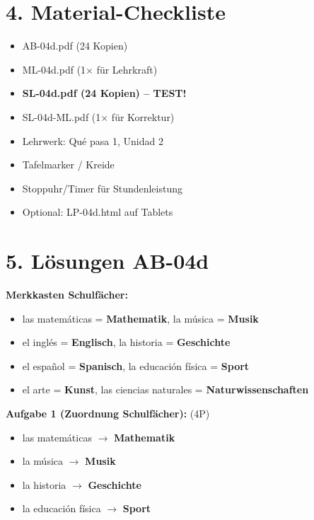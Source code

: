\documentclass[11pt, a4paper]{article}
\newcommand{\sequenz}{04}
\newcommand{\block}{d}
\newcommand{\lerngruppengroesse}{24}
\newcommand{\loesung}[1]{\textcolor{loesung}{\textbf{#1}}}
\begin{document}
\section*{4. Material-Checkliste}

\begin{materialbox}
\begin{itemize}[label=$\square$]
    \item AB-\sequenz\block.pdf (\lerngruppengroesse{} Kopien)
    \item ML-\sequenz\block.pdf (1$\times$ für Lehrkraft)
    \item \textbf{SL-\sequenz\block.pdf (\lerngruppengroesse{} Kopien) -- TEST!}
    \item SL-\sequenz\block-ML.pdf (1$\times$ für Korrektur)
    \item Lehrwerk: Qué pasa 1, Unidad 2
    \item Tafelmarker / Kreide
    \item Stoppuhr/Timer für Stundenleistung
    \item Optional: LP-\sequenz\block.html auf Tablets
\end{itemize}
\end{materialbox}

\section*{5. Lösungen AB-\sequenz\block}

\textbf{Merkkasten Schulfächer:}
\begin{itemize}
    \item las matemáticas = \loesung{Mathematik}, la música = \loesung{Musik}
    \item el inglés = \loesung{Englisch}, la historia = \loesung{Geschichte}
    \item el español = \loesung{Spanisch}, la educación física = \loesung{Sport}
    \item el arte = \loesung{Kunst}, las ciencias naturales = \loesung{Naturwissenschaften}
\end{itemize}

\textbf{Aufgabe 1 (Zuordnung Schulfächer):} (4P)
\begin{itemize}
    \item las matemáticas $\rightarrow$ \loesung{Mathematik}
    \item la música $\rightarrow$ \loesung{Musik}
    \item la historia $\rightarrow$ \loesung{Geschichte}
    \item la educación física $\rightarrow$ \loesung{Sport}
\end{itemize}
\end{document}
